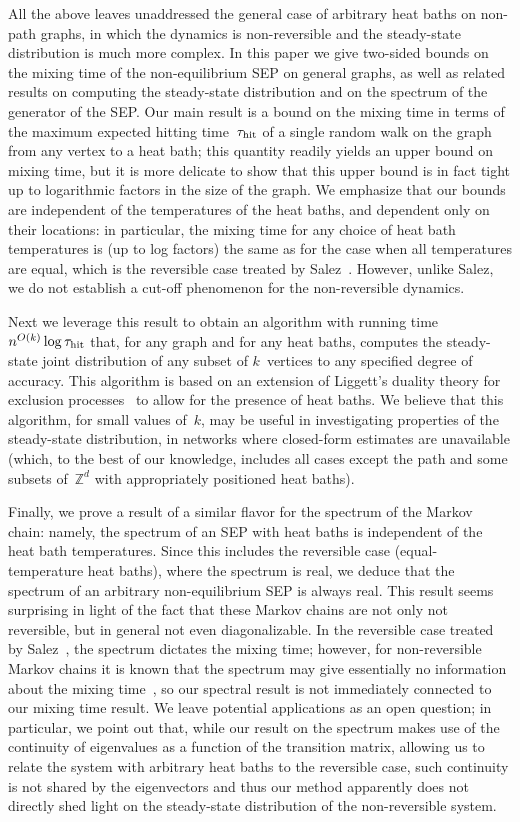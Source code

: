 \documentclass[11pt]{article}
\theoremstyle{plain}
\theoremstyle{definition}
\theoremstyle{remark}
\newcommand{\zset}{\mathbb Z}
\numberwithin{equation}{section}
\newcommand{\hit}{\tau_{\rm hit}}
\begin{document}
All the above leaves unaddressed the general case of arbitrary heat baths on non-path graphs,
in which the dynamics is non-reversible and the steady-state distribution is much more complex. In this paper we
give two-sided bounds on the mixing time of the non-equilibrium SEP on general graphs, as well as related
results on computing the steady-state distribution and on the spectrum of the generator of the SEP.  
Our main result is a bound on the mixing time in terms of the
maximum expected hitting time~$\hit$ of a single random walk on the graph from any vertex to a heat bath; 
this quantity readily yields an upper bound on mixing time, but it is more delicate to show that this upper bound
is in fact tight up to logarithmic factors in the size of the graph. We emphasize that our bounds are independent
of the temperatures of the heat baths, and dependent only on their locations: in particular, the mixing time for
any choice of heat bath
temperatures is (up to log factors) the same as for the case when all temperatures are equal, which is the reversible
case treated by Salez~\cite{Salez23}. However, unlike Salez,
we do not establish a cut-off phenomenon for the non-reversible dynamics. 

Next we leverage this result to obtain an algorithm with running time $n^{O(k)}\log \hit$ that, for any graph
and for any heat baths, 
computes the steady-state joint distribution of any subset of $k$~vertices to any specified degree of accuracy.
This algorithm is based on an extension of Liggett's duality theory for exclusion processes~\cite{Liggett85} 
to allow for the presence of heat baths. We believe that this algorithm, for small values of~$k$, 
may be useful in investigating properties of the steady-state distribution, in networks where closed-form
estimates are unavailable (which, to the best of our knowledge, includes all cases except the path
and some subsets of~$\zset^d$ with appropriately positioned heat baths).

Finally, we prove a result of a similar flavor for the spectrum of the Markov chain: namely, 
the spectrum of an SEP with heat baths is independent of the heat bath temperatures.  Since this
includes the reversible case (equal-temperature heat baths), where the spectrum is real, we deduce
that the spectrum of an arbitrary non-equilibrium SEP is always real.  This result seems surprising
in light of the fact that these Markov chains are not only not reversible, but in general not even
diagonalizable. In the reversible case treated by Salez~\cite{Salez23}, the spectrum dictates the mixing time;
however, for non-reversible Markov chains it is known that the spectrum may give essentially no
information about the mixing time~\cite{MehtaS20}, so our spectral result is not immediately
connected to our mixing time result.  We leave potential applications as an open question; in particular,
we point out that, while our result on the spectrum makes use of the continuity of eigenvalues
as a function of the transition matrix, allowing us to relate the system with arbitrary heat baths
to the reversible case, such continuity is not shared by the eigenvectors and thus our method
apparently does not directly shed light on the steady-state distribution of the non-reversible system.
\end{document}
